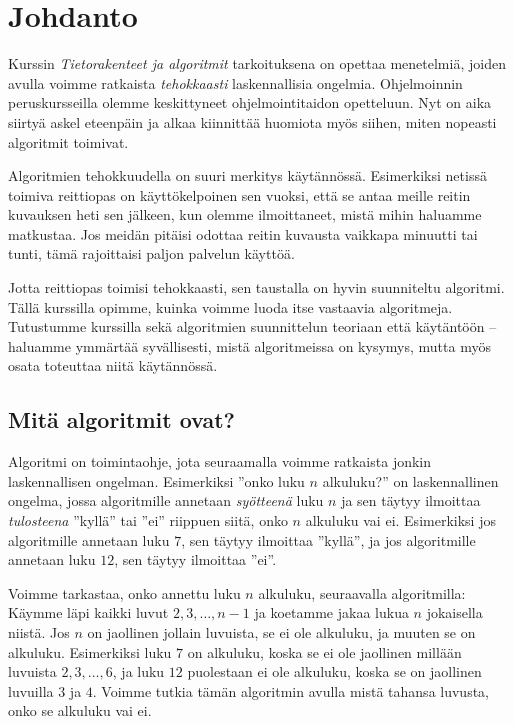 \chapter{Johdanto}

Kurssin \emph{Tietorakenteet ja algoritmit} tarkoituksena
on opettaa menetelmiä, joiden avulla voimme ratkaista
\emph{tehokkaasti} laskennallisia ongelmia.
Ohjelmoinnin peruskursseilla olemme keskittyneet
ohjelmointitaidon opetteluun.
Nyt on aika siirtyä askel eteenpäin ja alkaa kiinnittää
huomiota myös siihen, miten nopeasti algoritmit toimivat.

Algoritmien tehokkuudella on suuri merkitys käytännössä.
Esimerkiksi netissä toimiva reittiopas on käyttökelpoinen sen vuoksi,
että se antaa meille reitin kuvauksen heti sen jälkeen, kun olemme
ilmoittaneet, mistä mihin haluamme matkustaa.
Jos meidän pitäisi odottaa reitin kuvausta vaikkapa minuutti tai tunti,
tämä rajoittaisi paljon palvelun käyttöä.

Jotta reittiopas toimisi tehokkaasti, sen taustalla on
hyvin suunniteltu algoritmi.
Tällä kurssilla opimme, kuinka voimme luoda itse vastaavia algoritmeja.
Tutustumme kurssilla sekä algoritmien suunnittelun teoriaan että
käytäntöön -- haluamme ymmärtää syvällisesti, mistä algoritmeissa on kysymys,
mutta myös osata toteuttaa niitä käytännössä.

\section{Mitä algoritmit ovat?}

Algoritmi on toimintaohje, jota seuraamalla voimme ratkaista
jonkin laskennallisen ongelman.
Esimerkiksi ''onko luku $n$ alkuluku?'' on laskennallinen ongelma,
jossa algoritmille annetaan \emph{syötteenä} luku $n$
ja sen täytyy ilmoittaa \emph{tulosteena} ''kyllä'' tai ''ei'' riippuen siitä,
onko $n$ alkuluku vai ei.
Esimerkiksi jos algoritmille annetaan luku $7$,
sen täytyy ilmoittaa ''kyllä'',
ja jos algoritmille annetaan luku $12$,
sen täytyy ilmoittaa ''ei''.

Voimme tarkastaa, onko annettu luku $n$ alkuluku, seuraavalla algoritmilla:
Käymme läpi kaikki luvut $2,3,\dots,n-1$ ja koetamme
jakaa lukua $n$ jokaisella niistä.
Jos $n$ on jaollinen jollain luvuista, se ei ole alkuluku,
ja muuten se on alkuluku.
Esimerkiksi luku $7$ on alkuluku, koska se ei ole jaollinen
millään luvuista $2,3,\dots,6$,
ja luku $12$ puolestaan ei ole alkuluku, koska se on
jaollinen luvuilla $3$ ja $4$.
Voimme tutkia tämän algoritmin avulla mistä tahansa luvusta,
onko se alkuluku vai ei.

